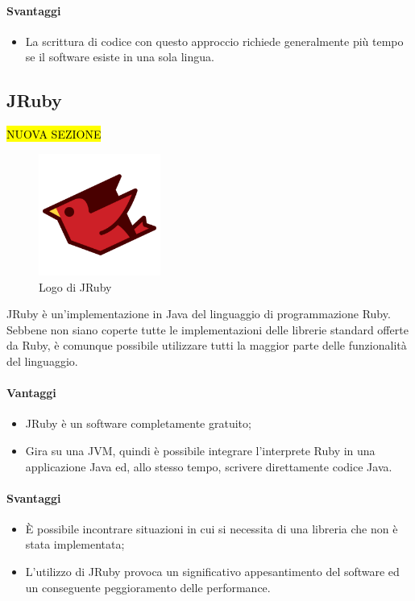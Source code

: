 \paragraph{Svantaggi}
	\begin{itemize}
		\item La scrittura di codice con questo approccio richiede generalmente più tempo se il software esiste in una sola lingua.
	\end{itemize}
\subsection{JRuby}
	\hl{NUOVA SEZIONE}
	\begin{figure}[H]
		\begin{center}
			\includegraphics[width=4cm]{Pics/jruby-logo.png}
			\caption{Logo di JRuby}
			\label{fig:JRubyLogo}
		\end{center}
	\end{figure}
	JRuby è un'implementazione in Java del linguaggio di programmazione Ruby. \\
	Sebbene non siano coperte tutte le implementazioni delle librerie standard offerte da Ruby, è comunque possibile utilizzare tutti la maggior parte delle funzionalità del  linguaggio.
\paragraph{Vantaggi}
\begin{itemize}
	\item JRuby è un software completamente gratuito;
	\item Gira su una JVM, quindi è possibile integrare l'interprete Ruby in una applicazione Java ed, allo stesso tempo, scrivere direttamente codice Java.
\end{itemize}
\paragraph{Svantaggi}
	\begin{itemize}
		\item È possibile incontrare situazioni in cui si necessita di una libreria che non è stata implementata;
		\item L'utilizzo di JRuby provoca un significativo appesantimento del software ed un conseguente peggioramento delle performance. 
	\end{itemize}
